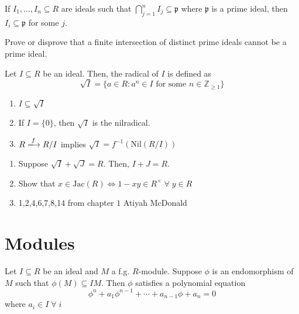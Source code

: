 \documentclass[oneside, 12pt]{scrbook}
\newcommand{\ZZ}{\mathbb Z}
\newcommand{\pr}{\mathfrak{p}}
\newcommand{\nil}{\mathrm{Nil}}
\theoremstyle{theorem}
\begin{document}
\begin{theorem}
If $I_{1}, \hdots ,I_{n} \subseteq R$ are ideals such that $\bigcap_{j=1}^n I_{j} \subseteq \pr$ where $\pr$ is a prime ideal, then $I_{i} \subseteq \pr$ for some $j$.
\end{theorem}

\begin{exercise}
Prove or disprove that a finite intersection of distinct prime ideals cannot be a prime ideal.
\end{exercise}

\begin{definition}
Let $I \subseteq R$ be an ideal. Then, the radical of $I$ is defined as 
\begin{equation}
\sqrt{I} = \{a \in R : a^n \in I \text{ for some } n \in \ZZ_{\geq 1}\}
\end{equation}
\end{definition}

\begin{remark}
\begin{enumerate}
\item $I \subseteq \sqrt{I}$
\item If $I = \{0\}$, then $\sqrt{I}$ is the nilradical. 
\item $R \xlongrightarrow{f} R/I$ implies $\sqrt{I} = f^{-1}(\nil(R/I))$
\end{enumerate}
\end{remark}

\begin{exercise}
\begin{enumerate}
\item Suppose $\sqrt{I} + \sqrt{J} = R$. Then, $I + J = R$. 
\item Show that $x \in \mathrm{Jac}(R) \Leftrightarrow 1-xy \in R^{\times} \; \forall \; y \in R$
\item 1,2,4,6,7,8,14 from chapter $1$ Atiyah McDonald
\end{enumerate}
\end{exercise}

\chapter{Modules}

\begin{theorem}
Let $I \subseteq R$ be an ideal and $M$ a f.g. $R$-module. Suppose $\phi$ is an endomorphism of $M$ such that $\phi(M) \subseteq IM$. Then $\phi$ satisfies a polynomial equation 
\begin{equation}
\phi^n + a_{1}\phi^{n-1} + \cdots + a_{n-1}\phi + a_{n} = 0
\end{equation}
where $a_{i} \in I \; \forall \; i$
\end{theorem}
\end{document}

